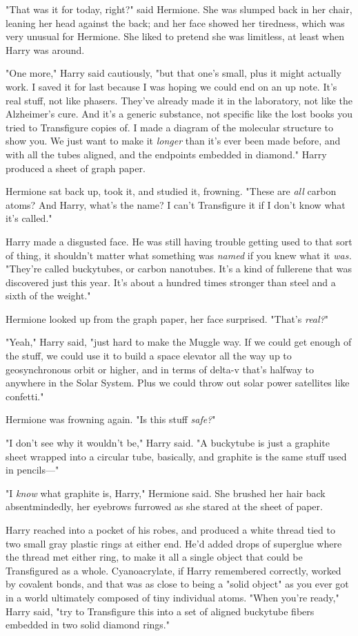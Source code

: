 "That was it for today, right?" said Hermione. She was slumped back in her
chair, leaning her head against the back; and her face showed her tiredness,
which was very unusual for Hermione. She liked to pretend she was limitless, at
least when Harry was around.

"One more," Harry said cautiously, "but that one's small, plus it might
actually work. I saved it for last because I was hoping we could end on an up
note. It's real stuff, not like phasers. They've already made it in the
laboratory, not like the Alzheimer's cure. And it's a generic substance, not
specific like the lost books you tried to Transfigure copies of. I made a
diagram of the molecular structure to show you. We just want to make it
\emph{longer} than it's ever been made before, and with all the tubes aligned,
and the endpoints embedded in diamond." Harry produced a sheet of graph paper.

Hermione sat back up, took it, and studied it, frowning. "These are \emph{all}
carbon atoms? And Harry, what's the name? I can't Transfigure it if I don't
know what it's called."

Harry made a disgusted face. He was still having trouble getting used to that
sort of thing, it shouldn't matter what something was \emph{named} if you knew
what it \emph{was.} "They're called buckytubes, or carbon nanotubes. It's a
kind of fullerene that was discovered just this year. It's about a hundred
times stronger than steel and a sixth of the weight."

Hermione looked up from the graph paper, her face surprised. "That's
\emph{real?}"

"Yeah," Harry said, "just hard to make the Muggle way. If we could get enough
of the stuff, we could use it to build a space elevator all the way up to
geosynchronous orbit or higher, and in terms of delta-v that's halfway to
anywhere in the Solar System. Plus we could throw out solar power satellites
like confetti."

Hermione was frowning again. "Is this stuff \emph{safe?}"

"I don't see why it wouldn't be," Harry said. "A buckytube is just a graphite
sheet wrapped into a circular tube, basically, and graphite is the same stuff
used in pencils---"

"I \emph{know} what graphite is, Harry," Hermione said. She brushed her hair
back absentmindedly, her eyebrows furrowed as she stared at the sheet of paper.

Harry reached into a pocket of his robes, and produced a white thread tied to
two small gray plastic rings at either end. He'd added drops of superglue where
the thread met either ring, to make it all a single object that could be
Transfigured as a whole. Cyanoacrylate, if Harry remembered correctly, worked
by covalent bonds, and that was as close to being a "solid object" as you ever
got in a world ultimately composed of tiny individual atoms. "When you're
ready," Harry said, "try to Transfigure this into a set of aligned buckytube
fibers embedded in two solid diamond rings."

